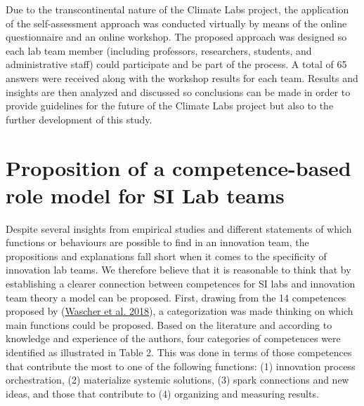 \documentclass[AMA,STIX1COL,APA,STIX2COL]{WileyNJD-v2}
\begin{document}
Due to the transcontinental nature of the Climate Labs project, the
application of the self-assessment approach was conducted virtually by
means of the online questionnaire and an online workshop. The proposed
approach was designed so each lab team member (including professors,
researchers, students, and administrative staff) could participate and
be part of the process. A total of 65 answers were received along with
the workshop results for each team. Results and insights are then
analyzed and discussed so conclusions can be made in order to provide
guidelines for the future of the Climate Labs project but also to the
further development of this study.

\hypertarget{proposition-of-a-competence-based-role-model-for-si-lab-teams}{%
\section{Proposition of a competence-based role model for SI Lab
teams}\label{proposition-of-a-competence-based-role-model-for-si-lab-teams}}

Despite several insights from empirical studies and different statements
of which functions or behaviours are possible to find in an innovation
team, the propositions and explanations fall short when it comes to the
specificity of innovation lab teams. We therefore believe that it is
reasonable to think that by establishing a clearer connection between
competences for SI labs and innovation team theory a model can be
proposed. First, drawing from the 14 competences proposed by
(\protect\hyperlink{ref-Wascher2018}{Wascher et al. 2018}), a
categorization was made thinking on which main functions could be
proposed. Based on the literature and according to knowledge and
experience of the authors, four categories of competences were
identified as illustrated in Table 2. This was done in terms of those
competences that contribute the most to one of the following functions:
(1) innovation process orchestration, (2) materialize systemic
solutions, (3) spark connections and new ideas, and those that
contribute to (4) organizing and measuring results.

\providecommand{\docline}[3]{\noalign{\global\setlength{\arrayrulewidth}{#1}}\arrayrulecolor[HTML]{#2}\cline{#3}}

\setlength{\tabcolsep}{2pt}

\renewcommand*{\arraystretch}{1.5}
\end{document}
